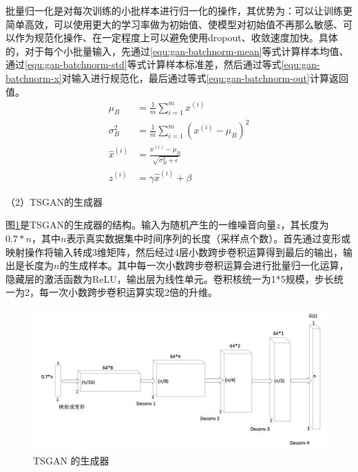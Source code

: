 批量归一化是对每次训练的小批样本进行归一化的操作，其优势为：可以让训练更简单高效，可以使用更大的学习率做为初始值、使模型对初始值不再那么敏感、可以作为规范化操作、在一定程度上可以避免使用dropout、收敛速度加快。具体的，对于每个小批量输入，先通过\ref{equ:gan-batchnorm-mean}等式计算样本均值、通过\ref{equ:gan-batchnorm-std}等式计算样本标准差，然后通过等式\ref{equ:gan-batchnorm-x}对输入进行规范化，最后通过等式\ref{equ:gan-batchnorm-out}计算返回值。
\begin{subequations}
\begin{align}
\mu_{B} &= \frac{1}{m}\sum_{i=1}^{m}x^{(i)}\label{equ:gan-batchnorm-mean}\\
\sigma_{B}^{2} &= \frac{1}{m}\sum_{i=1}^{m}(x^{(i)}-\mu_{B})^{2} \label{equ:gan-batchnorm-std}\\
\hat{x}^{(i)} &= \frac{x^{(i)}-\mu_{B}}{\sqrt{\sigma_{B}^{2}+\epsilon }} \label{equ:gan-batchnorm-x}\\
z^{(i)} &= \gamma \hat{x}^{(i)} + \beta \label{equ:gan-batchnorm-out}
\end{align}
\end{subequations}

 （2）TSGAN的生成器

图\ref{fig:gan-ts-generator}是TSGAN的生成器的结构。输入为随机产生的一维噪音向量$z$，其长度为$0.7*n$，其中$n$表示真实数据集中时间序列的长度（采样点个数）。首先通过变形或映射操作将输入转成3维矩阵，然后经过4层小数跨步卷积运算得到最后的输出，输出是长度为$n$的生成样本。其中每一次小数跨步卷积运算会进行批量归一化运算，隐藏层的激活函数为ReLU，输出层为线性单元。卷积核统一为1*5规模，步长统一为2，每一次小数跨步卷积运算实现2倍的升维。

\begin{figure}[H]
\centering
\includegraphics[scale=0.5]{figures/gan-ts-generator.png}
\caption{TSGAN 的生成器}
\label{fig:gan-ts-generator}
\end{figure}

